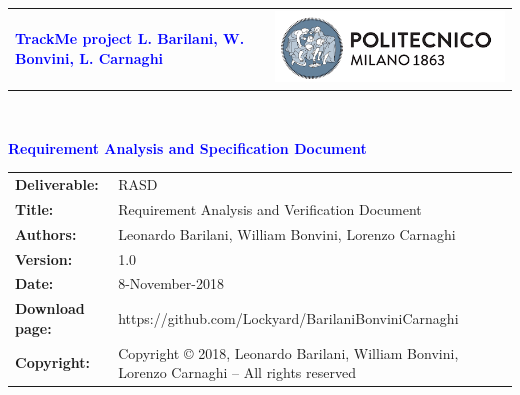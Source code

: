 




\begin{titlepage}



{\begin{table}[t!]
\centering
\begin{tabu} to \textwidth { X[1.3,r,p] X[1.7,l,p] }
\textcolor{Blue}
{\textbf{\small{TrackMe project L. Barilani, W. Bonvini, L. Carnaghi}}} & \includegraphics[scale=0.5]{Images/PolimiLogo}
\end{tabu}
\end{table}}~\\ [7cm]


\begin{flushleft}

{\textcolor{Blue}{\textbf{\Huge{Requirement Analysis and Specification
        Document}}}} \\ [1cm]

\end{flushleft}

\end{titlepage}

\begin{table}[h!]
\begin{tabu} to \textwidth { X[0.3,r,p] X[0.7,l,p] }
\hline

\textbf{Deliverable:} & RASD\\
\textbf{Title:} & Requirement Analysis and Verification Document \\
\textbf{Authors:} & Leonardo Barilani, William Bonvini, Lorenzo Carnaghi \\
\textbf{Version:} & 1.0 \\ 
\textbf{Date:} & 8-November-2018 \\
\textbf{Download page:} & https://github.com/Lockyard/BarilaniBonviniCarnaghi \\
\textbf{Copyright:} & Copyright © 2018, Leonardo Barilani, William Bonvini, Lorenzo Carnaghi – All rights reserved \\
\hline
\end{tabu}
\end{table}




